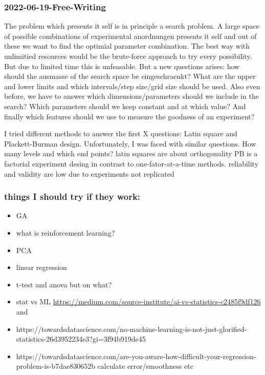 \subsubsection{2022-06-19-Free-Writing}
The problem which presents it self is in principle a search problem.
A large space of possible combinations of experimental anordnungen presents it self
and out of these we want to find the optimial parameter combination. 
The best way with unlimitied resources would be the brute-force approach to try every possibility. 
But due to limited time this is unfeasable. 
But a new questions arises: how should the ausmasse of the search space be eingeschraenkt? 
What are the upper and lower limits and which intervals/step size/grid size should be used. 
Also even before, we have to answer which dimensions/parameters should we include in the search? 
Which parameters should we keep constant and at which value? 
And finally which features should we use to measure the goodness of an experiment? 

I tried different methods to answer the first X questions: Latin square and Plackett-Burman design.
Unfortunately, I was faced with similar questions. How many levels and which end points? 
latin squares are about orthogonality 
PB is a factorial experiment desing in contrast to one-fator-at-a-time methods.
reliability and validity are low due to experiments not replicated 

\subsubsection{things I should try if they work:}
\begin{itemize}
    \item GA 
    \item what is reinforcement learning? 
    \item PCA
    \item linear regression
	\item t-test and anova but on what? 
    \item stat vs ML \url{https://medium.com/source-institute/ai-vs-statistics-c2485f9df126} and 
    \item https://towardsdatascience.com/no-machine-learning-is-not-just-glorified-statistics-26d3952234e3?gi=3f94b919de45
    \item https://towardsdatascience.com/are-you-aware-how-difficult-your-regression-problem-is-b7dae830652b calculate error/smoothness etc
\end{itemize}

